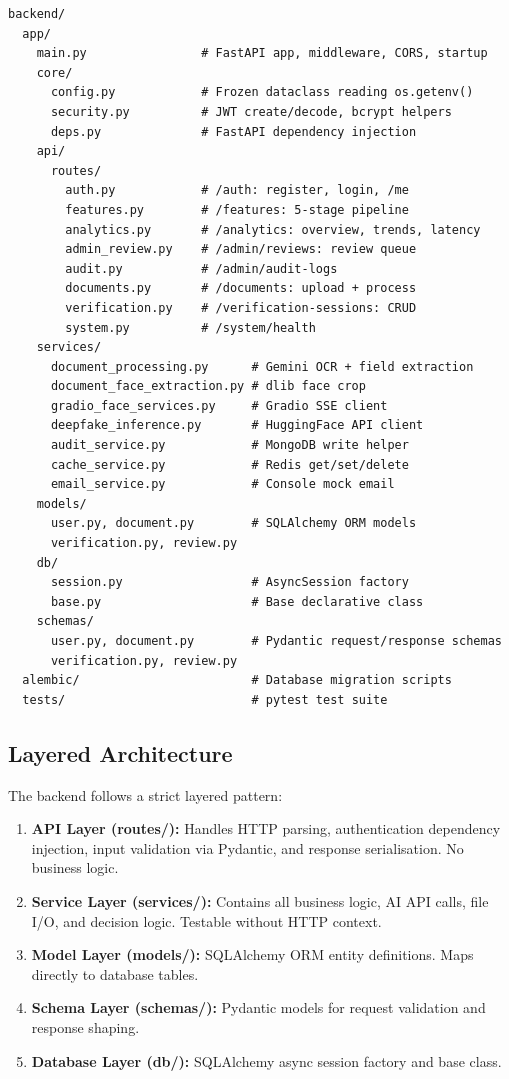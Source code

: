 \begin{lstlisting}[style=pythonstyle, caption=Backend Directory Structure]
backend/
  app/
    main.py                # FastAPI app, middleware, CORS, startup
    core/
      config.py            # Frozen dataclass reading os.getenv()
      security.py          # JWT create/decode, bcrypt helpers
      deps.py              # FastAPI dependency injection
    api/
      routes/
        auth.py            # /auth: register, login, /me
        features.py        # /features: 5-stage pipeline
        analytics.py       # /analytics: overview, trends, latency
        admin_review.py    # /admin/reviews: review queue
        audit.py           # /admin/audit-logs
        documents.py       # /documents: upload + process
        verification.py    # /verification-sessions: CRUD
        system.py          # /system/health
    services/
      document_processing.py      # Gemini OCR + field extraction
      document_face_extraction.py # dlib face crop
      gradio_face_services.py     # Gradio SSE client
      deepfake_inference.py       # HuggingFace API client
      audit_service.py            # MongoDB write helper
      cache_service.py            # Redis get/set/delete
      email_service.py            # Console mock email
    models/
      user.py, document.py        # SQLAlchemy ORM models
      verification.py, review.py
    db/
      session.py                  # AsyncSession factory
      base.py                     # Base declarative class
    schemas/
      user.py, document.py        # Pydantic request/response schemas
      verification.py, review.py
  alembic/                        # Database migration scripts
  tests/                          # pytest test suite
\end{lstlisting}

\subsection{Layered Architecture}

The backend follows a strict layered pattern:
\begin{enumerate}
    \item \textbf{API Layer (routes/):} Handles HTTP parsing, authentication dependency injection, input validation via Pydantic, and response serialisation. No business logic.
    \item \textbf{Service Layer (services/):} Contains all business logic, AI API calls, file I/O, and decision logic. Testable without HTTP context.
    \item \textbf{Model Layer (models/):} SQLAlchemy ORM entity definitions. Maps directly to database tables.
    \item \textbf{Schema Layer (schemas/):} Pydantic models for request validation and response shaping.
    \item \textbf{Database Layer (db/):} SQLAlchemy async session factory and base class.
\end{enumerate}

